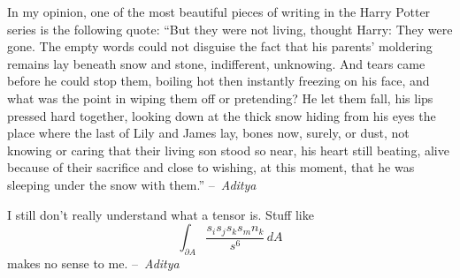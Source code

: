 \documentclass[12pt]{article}
\begin{document}
\begin{center}
\vspace{1cm}

In my opinion, one of the most beautiful pieces of writing in the Harry Potter series is the following quote: ``But they were not living, thought Harry: They were gone. The empty words could not disguise the fact that his parents' moldering remains lay beneath snow and stone, indifferent, unknowing. And tears came before he could stop them, boiling hot then instantly freezing on his face, and what was the point in wiping them off or pretending? He let them fall, his lips pressed hard together, looking down at the thick snow hiding from his eyes the place where the last of Lily and James lay, bones now, surely, or dust, not knowing or caring that their living son stood so near, his heart still beating, alive because of their sacrifice and close to wishing, at this moment, that he was sleeping under the snow with them.'' --~\textit{Aditya}

\vspace{1cm}

I still don't really understand what a tensor is. Stuff like $$\int_{\partial A} \frac{s_i s_j s_k s_m n_k}{s^6} \, dA$$ makes no sense to me. --~\textit{Aditya}

\vspace{1cm}

\end{center}
\end{document}
